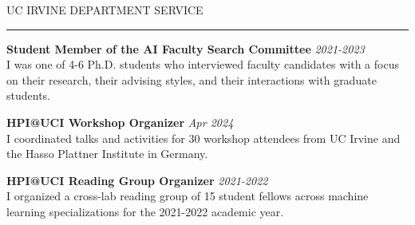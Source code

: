 \documentclass{resume} %
\renewenvironment{rSection}[1]{
\sectionskip
\textcolor{CarnegieMellonRed}{\MakeUppercase{#1}}
\sectionlineskip
\hrule
\begin{list}{}{
\setlength{\leftmargin}{1.5em}
}
\item[]
}{
\end{list}
}
\begin{document}
\begin{rSection}{UC Irvine Department Service}	
{\bf Student Member of the AI Faculty Search Committee} \hfill {\em 2021-2023}\\
I was one of 4-6 Ph.D. students who interviewed faculty candidates with a focus on their research, their advising styles, and their interactions with graduate students.
  \vspace{1.em}

{\bf HPI@UCI Workshop Organizer} \hfill {\em Apr 2024}\\
I coordinated talks and activities for 30 workshop attendees from UC Irvine and the Hasso Plattner Institute in Germany. \vspace{1.em}

{\bf HPI@UCI Reading Group Organizer} \hfill {\em 2021-2022}\\
I organized a cross-lab reading group of 15 student fellows across machine learning specializations for the 2021-2022 academic year. \vspace{1.em}

\end{rSection}
\end{document}
